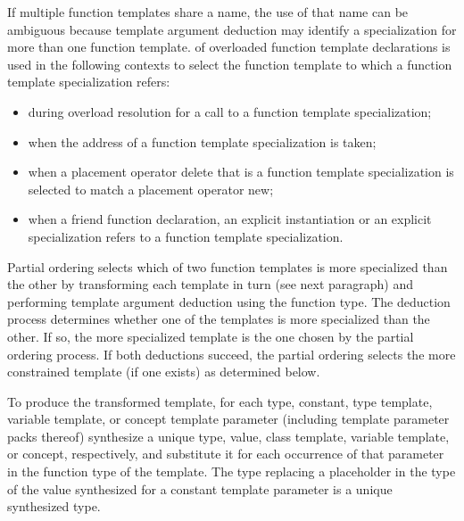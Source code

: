 \pnum
{}%
%
If multiple function templates share a name,
the use of that name can be ambiguous because
template argument deduction may identify
a specialization for more than one function template.
of overloaded function template declarations is used in the following contexts
to select the function template to which a function template specialization
refers:
\begin{itemize}
\item
during overload resolution for a call to a function template specialization;
\item
when the address of a function template specialization is taken;
\item
when a placement operator delete that is a
function template
specialization
is selected to match a placement operator new;
\item
when a friend function declaration, an
explicit instantiation or an explicit specialization refers to
a function template specialization.
\end{itemize}

\pnum
Partial ordering selects which of two function templates is more
specialized than the other by transforming each template in turn
(see next paragraph) and performing template argument deduction
using the function type.
The deduction process determines whether
one of the templates is more specialized than the other. If so, the
more specialized template is the one chosen by the partial ordering
process.
If both deductions succeed, the partial ordering selects
the more constrained template (if one exists) as determined below.

\pnum
To produce the transformed template, for each
type, constant,
type template, variable template, or concept
template parameter (including template parameter packs
thereof) synthesize a unique type, value, class template,
variable template, or concept,
respectively, and substitute it for each occurrence of that parameter
in the function type of the template.
The type replacing a placeholder
in the type of the value synthesized for a constant template parameter
is a unique synthesized type.


